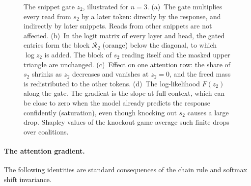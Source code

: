 \documentclass{article}
\begin{document}
\begin{figure}[t]
{%
}
\caption{The snippet gate $z_2$, illustrated for $n = 3$. (a)~The gate multiplies every read from $s_2$ by a later token: directly by the response, and indirectly by later snippets. Reads from other snippets are not affected. (b)~In the logit matrix of every layer and head, the gated entries form the block $\mathcal{R}_2$ (orange) below the diagonal, to which $\log z_2$ is added. The block of $s_2$ reading itself and the masked upper triangle are unchanged. (c)~Effect on one attention row: the share of $s_2$ shrinks as $z_2$ decreases and vanishes at $z_2 = 0$, and the freed mass is redistributed to the other tokens. (d)~The log-likelihood $F(z_2)$ along the gate. The gradient is the slope at full context, which can be close to zero when the model already predicts the response confidently (saturation), even though knocking out $s_2$ causes a large drop. Shapley values of the knockout game average such finite drops over coalitions.}
\label{fig:snippet_gate}
\end{figure}


\paragraph{The attention gradient.}
The following identities are standard consequences of the chain rule and softmax shift invariance.
\end{document}
